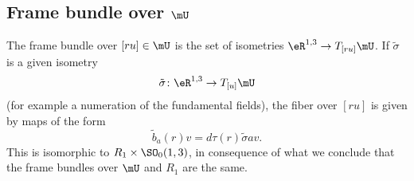 \subsection{Frame bundle over \texorpdfstring{$\mU$}{U}}

The frame bundle over $[ru]\in \mU$ is the set of isometries $\eR^{1,3}\to T_{[ru]}\mU$. If $\tilde\sigma$ is a given isometry 
\[ 
  \tilde\sigma\colon \eR^{1,3}\to T_{[u]}\mU
\]
(for example a numeration of the fundamental fields), the fiber over $[ru]$ is given by maps of the form
\begin{equation}
\tilde b_a(r)v=d\tau(r)\tilde\sigma av.
\end{equation}
This is isomorphic to $R_1\times\SO_0(1,3)$, in consequence of what we conclude that the frame bundles over $\mU$ and $R_1$ are the same.

